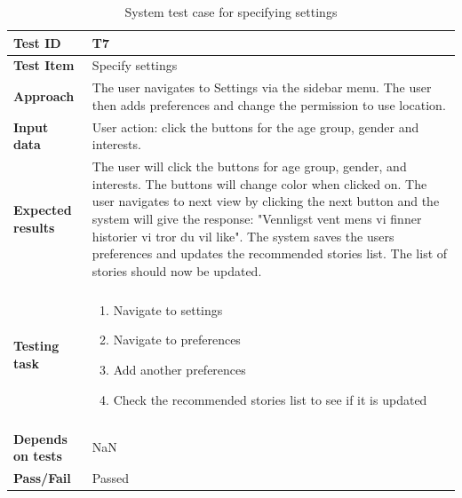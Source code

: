\begin{appendices}
	\begin{table}[H]
		\small
		\centering
		\caption{System test case for specifying settings}
		\begin{tabular}{ | l | l  |}
			\hline
			\textbf{Test ID} & T7  \\ \hline
			\textbf{Test Item} & Specify settings \\ \hline
			\textbf{Approach} & \begin{minipage}{5in}The user navigates to Settings via the sidebar menu. The user then adds preferences and change the permission to use location. \end{minipage}\\ \hline		
			\textbf{Input data} &  \begin{minipage}{5in}User action: click the buttons for the age group, gender and interests. \end{minipage}\\ \hline
			\textbf{Expected results} &  \begin{minipage}{5in}The user will click the buttons for age group, gender, and interests. The buttons will change color when clicked on. The user navigates to next view by clicking the next button and the system will give the response: "Vennligst vent mens vi finner historier vi tror du vil like". 
			The system saves the users preferences and updates the recommended stories list. The list of stories should now be updated.  \end{minipage}\\ \hline&\\[-3.8ex]
			\textbf{Testing task} & \begin{minipage}{5in}
			\begin{enumerate}[noitemsep]
				\item Navigate to settings
				\item Navigate to preferences
				\item Add another preferences
				\item Check the recommended stories list to see if it is updated

			\end{enumerate}\end{minipage}
			\\ &\\[-3.8ex]\hline
			\textbf{Depends on tests} & NaN \\ \hline		
			\textbf{Pass/Fail} & Passed \\\hline			
		\end{tabular}
	\label{Tab:systemTesting7}
	\end{table}
	

\end{appendices}
